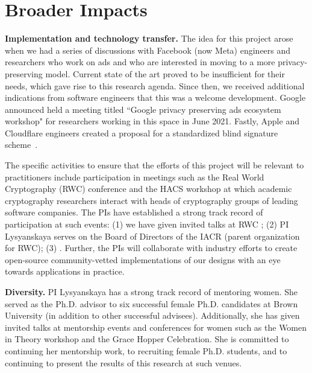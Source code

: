 \section{Broader Impacts}
\noindent\textbf{Implementation and technology transfer.}  
The idea for this project arose when we had a series of discussions with Facebook (now Meta) engineers and researchers who work on ads and who are interested in moving to a more privacy-preserving model.  Current state of the art proved to be insufficient for their needs, which gave rise to this research agenda.
%
Since then, we received additional indications from software engineers that this was a welcome development.  Google announced held a meeting titled ``Google privacy preserving ads ecosystem workshop" for researchers working in this space in June 2021.  Fastly, Apple and Cloudflare engineers created a proposal for a standardized blind signature scheme~\cite{ietf:djw21,ietf:djw22}.  


The specific activities to ensure that the efforts of this project will be relevant to practitioners include participation in meetings such as the Real World Cryptography (RWC) conference and the HACS workshop at which academic cryptography researchers interact with heads of cryptography groups of leading software companies.  The PIs have established a strong track record of participation at such events: (1) we have given invited talks at RWC ; (2) PI Lysyanskaya serves on the Board of Directors of the IACR (parent organization for RWC); (3) .
Further, the PIs will collaborate with industry efforts to create open-source community-vetted implementations of our designs with an eye towards applications in practice.  

\noindent\textbf{Diversity.} PI Lysyanskaya has a strong track record of mentoring women.  She served as the Ph.D. advisor to six successful female Ph.D. candidates at Brown University (in addition to other successful advisees).  Additionally, she has given invited talks at mentorship events and conferences for women such as the Women in Theory workshop and the Grace Hopper Celebration.  She is committed to continuing her mentorship work, to recruiting female Ph.D. students, and to continuing to present the results of this research at such venues.


